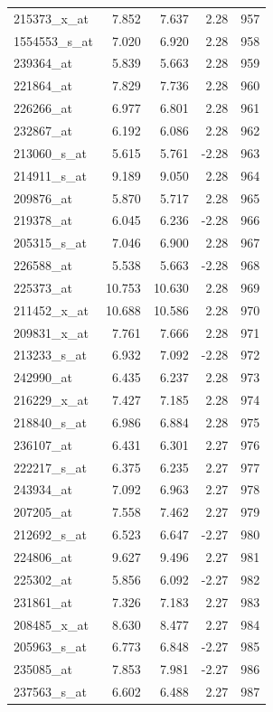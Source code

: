 \begin{footnotesize}
\begin{longtable}{lrrrr}
215373\_x\_at & 7.852 & 7.637 & 2.28 & 957 \\
1554553\_s\_at & 7.020 & 6.920 & 2.28 & 958 \\
239364\_at & 5.839 & 5.663 & 2.28 & 959 \\
221864\_at & 7.829 & 7.736 & 2.28 & 960 \\
226266\_at & 6.977 & 6.801 & 2.28 & 961 \\
232867\_at & 6.192 & 6.086 & 2.28 & 962 \\
213060\_s\_at & 5.615 & 5.761 & -2.28 & 963 \\
214911\_s\_at & 9.189 & 9.050 & 2.28 & 964 \\
209876\_at & 5.870 & 5.717 & 2.28 & 965 \\
219378\_at & 6.045 & 6.236 & -2.28 & 966 \\
205315\_s\_at & 7.046 & 6.900 & 2.28 & 967 \\
226588\_at & 5.538 & 5.663 & -2.28 & 968 \\
225373\_at & 10.753 & 10.630 & 2.28 & 969 \\
211452\_x\_at & 10.688 & 10.586 & 2.28 & 970 \\
209831\_x\_at & 7.761 & 7.666 & 2.28 & 971 \\
213233\_s\_at & 6.932 & 7.092 & -2.28 & 972 \\
242990\_at & 6.435 & 6.237 & 2.28 & 973 \\
216229\_x\_at & 7.427 & 7.185 & 2.28 & 974 \\
218840\_s\_at & 6.986 & 6.884 & 2.28 & 975 \\
236107\_at & 6.431 & 6.301 & 2.27 & 976 \\
222217\_s\_at & 6.375 & 6.235 & 2.27 & 977 \\
243934\_at & 7.092 & 6.963 & 2.27 & 978 \\
207205\_at & 7.558 & 7.462 & 2.27 & 979 \\
212692\_s\_at & 6.523 & 6.647 & -2.27 & 980 \\
224806\_at & 9.627 & 9.496 & 2.27 & 981 \\
225302\_at & 5.856 & 6.092 & -2.27 & 982 \\
231861\_at & 7.326 & 7.183 & 2.27 & 983 \\
208485\_x\_at & 8.630 & 8.477 & 2.27 & 984 \\
205963\_s\_at & 6.773 & 6.848 & -2.27 & 985 \\
235085\_at & 7.853 & 7.981 & -2.27 & 986 \\
237563\_s\_at & 6.602 & 6.488 & 2.27 & 987 \\

\end{longtable}
\end{footnotesize}
